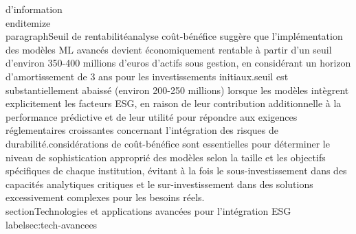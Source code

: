 d'information\n\\end{itemize}\n\n\\paragraph{Seuil de rentabilité}\n\nNotre analyse coût-bénéfice suggère que l'implémentation des modèles ML avancés devient économiquement rentable à partir d'un seuil d'environ 350-400 millions d'euros d'actifs sous gestion, en considérant un horizon d'amortissement de 3 ans pour les investissements initiaux.\n\nCe seuil est substantiellement abaissé (environ 200-250 millions) lorsque les modèles intègrent explicitement les facteurs ESG, en raison de leur contribution additionnelle à la performance prédictive et de leur utilité pour répondre aux exigences réglementaires croissantes concernant l'intégration des risques de durabilité.\n\nCes considérations de coût-bénéfice sont essentielles pour déterminer le niveau de sophistication approprié des modèles selon la taille et les objectifs spécifiques de chaque institution, évitant à la fois le sous-investissement dans des capacités analytiques critiques et le sur-investissement dans des solutions excessivement complexes pour les besoins réels.\n\n\\section{Technologies et applications avancées pour l'intégration ESG}\\label{sec:tech-avancees}\n\n